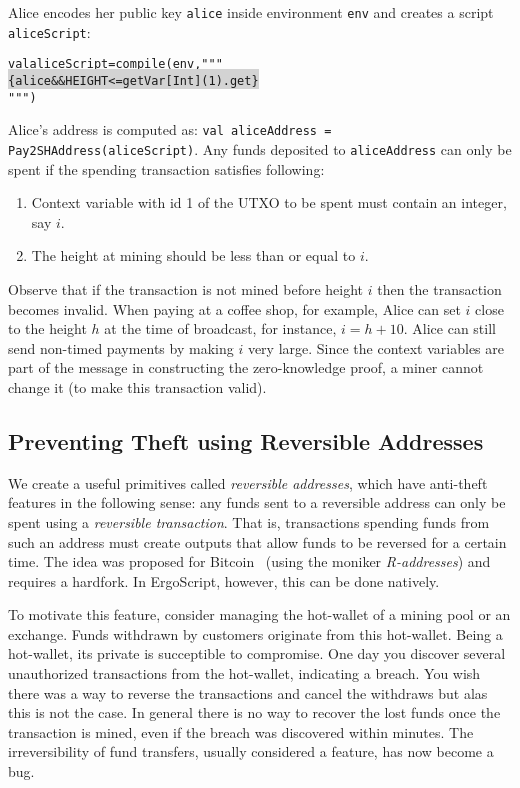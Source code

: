 \documentclass[11pt]{article}
\newcommand\Hi[2][lightgray]{%
	\hspace*{-\fboxsep}%
	\colorbox{#1}{#2}%
	\hspace*{-\fboxsep}%
}
\newcommand{\langname}{ErgoScript\xspace}
\begin{document}
Alice encodes her public key \texttt{alice} inside environment \texttt{env} and creates a script \texttt{aliceScript}:
\begin{alltt}
	val aliceScript = compile(env, """ \Hi{\{alice && HEIGHT <= getVar[Int](1).get\}}""")
\end{alltt}

Alice's address is computed as: \texttt{val aliceAddress = Pay2SHAddress(aliceScript)}. Any funds deposited to \texttt{aliceAddress} can only be spent if the spending transaction satisfies following:
\begin{enumerate}
	\item Context variable with id 1 of the UTXO to be spent must contain an integer, say $i$.
	\item The height at mining should be less than or equal to $i$. 
\end{enumerate}

Observe that if the transaction is not mined before height $i$ then the transaction becomes invalid. When paying at a coffee shop, for example, Alice can set $i$ close to the height $h$ at the time of broadcast, for instance, $i = h + 10$. 
Alice can still send non-timed payments by making $i$ very large. Since the context variables are part of the message in constructing the zero-knowledge proof, a miner cannot change it (to make this transaction valid). 

\subsection{Preventing Theft using Reversible Addresses}

We create a useful primitives called {\em reversible addresses}, which have anti-theft features in the following sense:
any funds sent to a reversible address can only be spent using a {\em reversible transaction}. That is, transactions spending funds from such an address must create outputs that allow funds to be reversed for a certain time. The idea was proposed for Bitcoin~\cite{raddress} (using the moniker {\em R-addresses}) and requires a hardfork. In \langname, however, this can be done natively.

To motivate this feature, consider managing the hot-wallet of a mining pool or an exchange. Funds withdrawn by customers originate from this hot-wallet. Being a hot-wallet, its private is succeptible to compromise. One day you discover several unauthorized transactions from the hot-wallet, indicating a breach. You wish there was a way to reverse the transactions and cancel the withdraws but alas this is not the case. In general there is no way to recover the lost funds once the transaction is mined, even if the breach was discovered within minutes. The irreversibility of fund transfers, usually considered a feature, has now become a bug.
\end{document}

